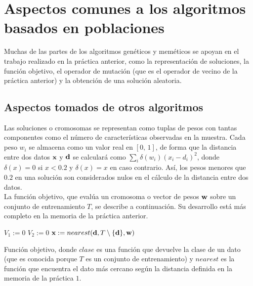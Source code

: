 \documentclass{article}
\newenvironment{algo}{
	\vspace*{0.5cm}
	\begin{algorithm}[H]}{
	\end{algorithm}
	\vspace*{0.5cm}
}
\begin{document}


\section{Aspectos comunes a los algoritmos basados en poblaciones}

Muchas de las partes de los algoritmos genéticos y meméticos se apoyan en el trabajo realizado en la práctica anterior, como la representación de soluciones, la función objetivo, el operador de mutación (que es el operador de vecino de la práctica anterior) y la obtención de una solución aleatoria.


\subsection{Aspectos tomados de otros algoritmos}

Las soluciones o cromosomas se representan como tuplas de pesos con tantas componentes como el número de características observadas en la muestra. Cada peso $w_i$ se almacena como un valor real en $[0,\,1]$, de forma que la distancia entre dos datos $\normalfont \textbf x$ y $\normalfont \textbf d$ se calculará como $\sum_i \delta(w_i)(x_i - d_i)^2$, donde $\delta(x) = 0$ si $x < 0.2$ y $\delta(x) = x$ en caso contrario. Así, los pesos menores que $0.2$ en una solución son considerados nulos en el cálculo de la distancia entre dos datos. \\

La función objetivo, que evalúa un cromosoma o vector de pesos $\textbf w$ sobre un conjunto de entrenamiento $T$, se describe a continuación. Su desarrollo está más completo en la memoria de la práctica anterior.

\begin{algo}
	
	$V_1 := 0$\;
	$V_2 := 0$\;
	 {
		$\normalfont \textbf x := nearest(\normalfont \textbf d, T \setminus \{ \normalfont \textbf d \}, \normalfont \textbf w)$\;
	}
	 {
	}
	\vspace{0.2cm}
	\caption{Función objetivo, donde $clase$ es una función que devuelve la clase de un dato (que es conocida porque $T$ es un conjunto de entrenamiento) y $nearest$ es la función que encuentra el dato más cercano según la distancia definida en la memoria de la práctica $1$.}
\end{algo}
\end{document}
